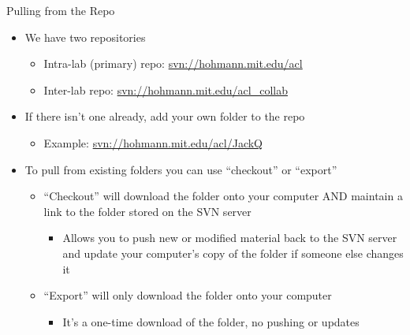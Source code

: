 \documentclass[11pt,mathserif]{beamer} %
\begin{document}
\begin{frame}[t]{Pulling from the Repo}
	\begin{itemize} 
		\item We have two repositories
		\begin{itemize}
			\item Intra-lab (primary) repo: \url{svn://hohmann.mit.edu/acl}
			\item Inter-lab repo: \url{svn://hohmann.mit.edu/acl_collab}
		\end{itemize}
\vspace{0.2in}
		\item If there isn't one already, add your own folder to the repo
		\begin{itemize}
			\item Example: \url{svn://hohmann.mit.edu/acl/JackQ}
		\end{itemize}
\vspace{0.2in}
		\item To pull from existing folders you can use ``checkout'' or ``export''
		\begin{itemize}
			\item ``Checkout'' will download the folder onto your computer AND maintain a link to the folder stored on the SVN server
			\begin{itemize}
				\item Allows you to push new or modified material back to the SVN server and update your computer's copy of the folder if someone else changes it
			\end{itemize}
			\item ``Export'' will only download the folder onto your computer
			\begin{itemize}
				\item It's a one-time download of the folder, no pushing or updates
			\end{itemize}
		\end{itemize}
	\end{itemize}
\end{frame}
\end{document}
